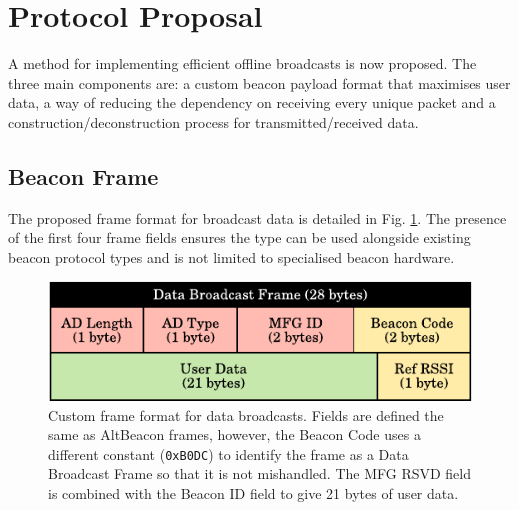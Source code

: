 \documentclass[conference]{IEEEtran} %
\begin{document}
\section{Protocol Proposal} 
A method for implementing efficient offline broadcasts is now proposed. The three main components are: a custom beacon payload format that maximises user data, a way of reducing the dependency on receiving every unique packet and a construction/deconstruction process for transmitted/received data.
\subsection{Beacon Frame}
The proposed frame format for broadcast data is detailed in Fig. \ref{fig:data_broadcast_frame}. The presence of the first four frame fields ensures the type can be used alongside existing beacon protocol types and is not limited to specialised beacon hardware. 
\begin{figure}[H]
    \centering
   	\includegraphics[scale=0.75]{Figures/data_broadcast_frame}
    \caption{
  Custom frame format for data broadcasts. Fields are defined the same as AltBeacon frames, however, the Beacon Code uses a different constant (\texttt{0xB0DC}) to identify the frame as a Data Broadcast Frame so that it is not mishandled. The MFG RSVD field is combined with the Beacon ID field to give 21 bytes of user data.
    }
    \label{fig:data_broadcast_frame}
\end{figure}
\end{document}
